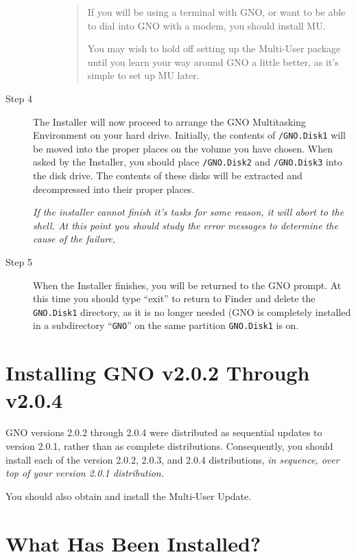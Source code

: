 \documentclass{report}
\begin{document}
\begin{description}
\begin{description}
\begin{quote}
	If you will be using a terminal with GNO, or want to be able to dial
        into GNO with a modem, you should install MU.
        
	You may wish to hold off setting up the Multi-User package until you
        learn your way around GNO a little better, as it's simple
        to set up MU later.

	\end{quote}

\end{description}

\item[Step 4]

The Installer will now proceed to arrange the GNO Multitasking
Environment on your hard drive. Initially, the contents of
\texttt{/GNO.Disk1} will be moved into the proper places on the
volume you have chosen. When asked by the Installer, you should place
\texttt{/GNO.Disk2} and \texttt{/GNO.Disk3} into the disk drive. The
contents of these disks will be extracted and decompressed into their
proper places.

\em
If the installer cannot finish it's tasks for some reason, it will
abort to the shell. At this point you should study the error messages
to determine the cause of the failure, 
\rm

\item[Step 5]

When the Installer finishes, you will be returned to the GNO prompt.
At this time you should type ``exit'' to return to Finder and delete
the \texttt{GNO.Disk1} directory, as it is no longer needed (GNO
is completely installed in a subdirectory ``\texttt{GNO}'' on the
same partition \texttt{GNO.Disk1} is on.

\end{description}

\section{Installing GNO v2.0.2 Through v2.0.4}

GNO versions 2.0.2 through 2.0.4 were distributed as sequential
updates to version 2.0.1, rather than as complete distributions.
Consequently, you should install each of the version 2.0.2,
2.0.3, and 2.0.4 distributions, \em in sequence, \rm  over top of your
version 2.0.1 distribution.

You should also obtain and install the Multi-User Update.

\section{What Has Been Installed?}
\end{document}
